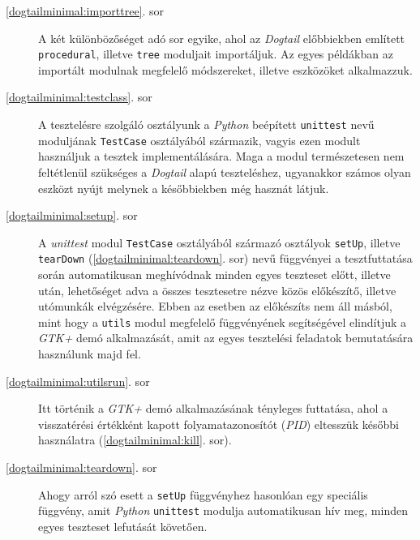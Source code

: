 \begin{description}
 \item[\ref{dogtailminimal:importtree}. sor] A két különbözőséget adó sor egyike, ahol az \textit{Dogtail} előbbiekben említett \texttt{procedural}, illetve \texttt{tree} moduljait importáljuk. Az egyes példákban az importált modulnak megfelelő módszereket, illetve eszközöket alkalmazzuk.

 \item[\ref{dogtailminimal:testclass}. sor] A tesztelésre szolgáló osztályunk a \textit{Python} beépített \texttt{unittest} nevű moduljának \texttt{TestCase} osztályából származik, vagyis ezen modult használjuk a tesztek implementálására. Maga a modul természetesen nem feltétlenül szükséges a \textit{Dogtail} alapú teszteléshez, ugyanakkor számos olyan eszközt nyújt melynek a későbbiekben még hasznát látjuk.

 \item[\ref{dogtailminimal:setup}. sor] A \textit{unittest} modul \texttt{TestCase} osztályából származó osztályok \texttt{setUp}, illetve \texttt{tearDown} (\ref{dogtailminimal:teardown}. sor) nevű függvényei a tesztfuttatása során automatikusan meghívódnak minden egyes teszteset előtt, illetve után, lehetőséget adva a összes tesztesetre nézve közös előkészítő, illetve utómunkák elvégzésére. Ebben az esetben az előkészíts nem áll másból, mint hogy a \texttt{utils} modul megfelelő függvényének segítségével elindítjuk a \textit{GTK+} demó alkalmazását, amit az egyes tesztelési feladatok bemutatására használunk majd fel.

 \item[\ref{dogtailminimal:utilsrun}. sor] Itt történik a \textit{GTK+} demó alkalmazásának tényleges futtatása, ahol a visszatérési értékként kapott folyamatazonosítót (\textit{PID}) eltesszük későbbi használatra (\ref{dogtailminimal:kill}. sor).

 \item[\ref{dogtailminimal:teardown}. sor] Ahogy arról szó esett a \texttt{setUp} függvényhez hasonlóan egy speciális függvény, amit \textit{Python} \texttt{unittest} modulja automatikusan hív meg, minden egyes teszteset lefutását követően.


\end{description}
